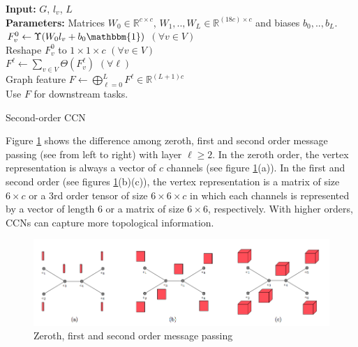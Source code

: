 \documentclass[sigchi]{acmart}
\theoremstyle{definition}
\theoremstyle{theorem}
\theoremstyle{corollary}
\theoremstyle{lemma}
\theoremstyle{remark}
\theoremstyle{prop}
\begin{document}
\begin{algorithm}
{\bfseries Input:} $G$, $l_v$, $L$ \\
{\bfseries Parameters:} Matrices $W_0 \in \mathbb{R}^{c \times c}$, $W_1, .., W_L \in \mathbb{R}^{(18c) \times c}$ and biases $b_0, .., b_L$. \\
$F_v^0 \leftarrow \Upsilon(W_0 l_v + b_0 \mathbbm{1})$ $(\forall v \in V)$ \\
Reshape $F_v^0$ to $1 \times 1 \times c$ $(\forall v \in V)$ \\
$F^\ell \leftarrow \sum_{v \in V} \Theta(F_v^\ell)$ $(\forall \ell)$ \\
Graph feature $F \leftarrow \bigoplus\limits_{\ell = 0}^L F^\ell \in \mathbb{R}^{(L + 1)c}$ \\
Use $F$ for downstream tasks.
\caption{\label{alg:second_order_algorithm} Second-order CCN}
\end{algorithm}

Figure \ref{fig:zero_to_second} shows the difference among zeroth, first and second order message passing (see from left to right) with layer $\ell \ge 2$. In the zeroth order, the vertex representation is always a vector of $c$ channels (see figure \ref{fig:zero_to_second}(a)). In the first and second order (see figures \ref{fig:zero_to_second}(b)(c)), the vertex representation is a matrix of size $6 \times c$ or a 3rd order tensor of size $6 \times 6 \times c$ in which each channels is represented by a vector of length $6$ or a matrix of size $6 \times 6$, respectively. With higher orders, CCNs can capture more topological information.
\begin{figure}
\caption{\label{fig:zero_to_second} Zeroth, first and second order message passing}
\centering
\includegraphics[scale=0.3]{zero_to_second}
\end{figure}
\end{document}
